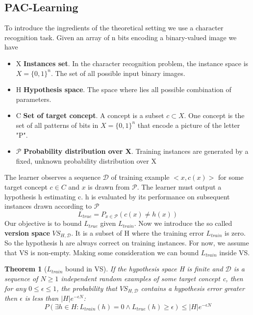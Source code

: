 \documentclass[main.tex]{subfiles}
\newtheorem{theorem}{Theorem}[section] %
\begin{document}
\subsection{PAC-Learning}
To introduce the ingredients of the theoretical setting we use a character recognition task. Given an array of n bits encoding a binary-valued image we have
\begin{itemize}
    \item X \textbf{Instances set}. In the character recognition problem, the instance space is $X=\{0,1\}^{n}$. The set of all possible input binary images.
    \item H \textbf{Hypothesis space}. The space where lies all possible combination of parameters.
    \item C \textbf{Set of target concept}. A concept is a subset $c\subset X$. One concept is the set of all patterns of bits in  $X=\{0,1\}^{n}$ that encode a picture of the letter "P".
    \item $\mathcal{P}$ \textbf{Probability distribution over X}. Training instances are generated by a fixed, unknown probability distribution over X
\end{itemize}
The learner observes a sequence $\mathcal{D}$ of training example $<x,c(x)>$ for some target concept $c \in C$ and $x$ is drawn from $\mathcal{P}$. The learner must output a hypothesis h estimating c. h is evaluated by its performance on subsequent instances drawn according to $\mathcal{P}$
\begin{equation*}
    L_{true} = P_{x \in \mathcal{P}}(c(x) \neq h(x))
\end{equation*}
Our objective is to bound $L_{true}$ given $L_{train}$.
Now we introduce the so called \textbf{version space} $VS_{H,\mathcal{D}}$. It is a subset of H where the training error $L_{train}$ is zero. So the hypothesis h are always correct on training instances. For now, we assume that VS is non-empty. Making some consideration we can bound $L_{train}$ inside VS.
\begin{theorem}[$L_{train}$ bound in VS]
    If the hypothesis space H is finite and $\mathcal{D}$ is a sequence of $N \geq 1$ independent random examples of some target concept c, then for any $0 \leq \epsilon \leq 1$, the probability that $VS_{H,\mathcal{D}}$ contains a hypothesis error greater then $\epsilon$ is less than $|H|e^{-\epsilon N}$:
    \begin{equation*}
        P(\exists h \in H: L_{train}(h)=0 \land L_{true}(h) \geq \epsilon) \leq |H|e^{-\epsilon N}
    \end{equation*}
\end{theorem}
\end{document}
